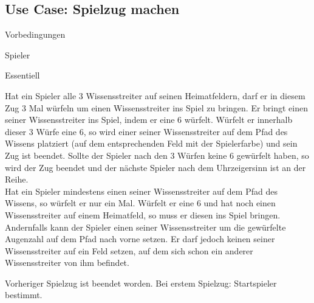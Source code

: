 \subsection{Use Case: Spielzug machen}
\begin{labeling}[:]{Vorbedingungen}
\item [Akteure] Spieler
\item [Priorität] Essentiell
\item [Beschreibung] Hat ein Spieler alle 3 Wissensstreiter auf seinen Heimatfeldern, darf er in diesem Zug 3 Mal würfeln um einen Wissensstreiter ins Spiel zu bringen. Er bringt einen seiner Wissensstreiter ins Spiel, indem er eine 6 würfelt. Würfelt er innerhalb dieser 3 Würfe eine 6, so wird einer seiner Wissensstreiter auf dem Pfad des Wissens platziert (auf dem entsprechenden Feld mit der Spielerfarbe) und sein Zug ist beendet. Sollte der Spieler nach den 3 Würfen keine 6 gewürfelt haben, so wird der Zug beendet und der nächste Spieler nach dem Uhrzeigersinn ist an der Reihe. \\
Hat ein Spieler mindestens einen seiner Wissensstreiter auf dem Pfad des Wissens, so würfelt er nur ein Mal. Würfelt er eine 6 und hat noch einen Wissensstreiter auf einem Heimatfeld, so muss er diesen ins Spiel bringen.
\\
Andernfalls kann der Spieler einen seiner Wissensstreiter um die gewürfelte Augenzahl auf dem Pfad nach vorne setzen. Er darf jedoch keinen seiner Wissensstreiter auf ein Feld setzen, auf dem sich schon ein anderer Wissensstreiter von ihm befindet.
\item [Vorbedingungen] Vorheriger Spielzug ist beendet worden. Bei erstem Spielzug: Startspieler bestimmt.
\item [Offene Punkte]
\end{labeling}


